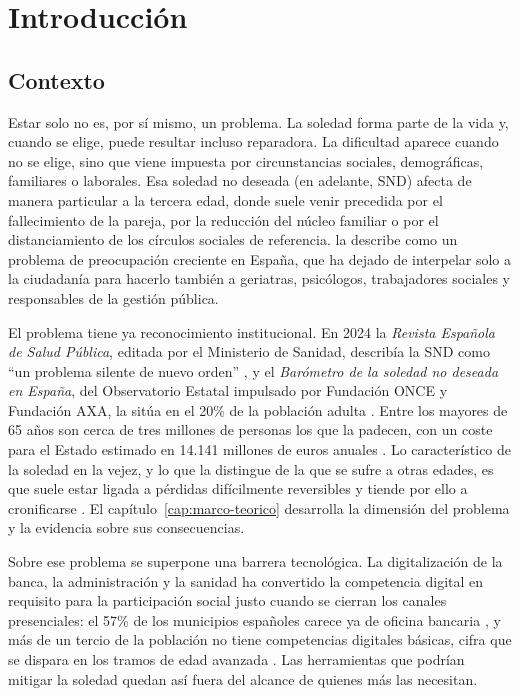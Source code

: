 \chapter{Introducción}
\label{cap:introduccion}

\section{Contexto}
\label{contexto}

Estar solo no es, por sí mismo, un problema. La soledad forma parte de la vida y, cuando se elige, puede
resultar incluso reparadora. La dificultad aparece cuando no se elige, sino que viene impuesta por
circunstancias sociales, demográficas, familiares o laborales. Esa soledad no deseada (en adelante, SND)
afecta de manera particular a la tercera edad, donde suele venir precedida por el fallecimiento de la pareja,
por la reducción del núcleo familiar o por el distanciamiento de los círculos sociales de referencia.
\textcite{RuedaEstrada2018} la describe como un problema de preocupación creciente en España, que ha dejado
de interpelar solo a la ciudadanía para hacerlo también a geriatras, psicólogos, trabajadores sociales y
responsables de la gestión pública.

El problema tiene ya reconocimiento institucional. En 2024 la \textit{Revista Española de Salud Pública},
editada por el Ministerio de Sanidad, describía la SND como \enquote{un problema silente de nuevo orden}
\citep{JimenezRodriguez2024}, y el \textit{Barómetro de la soledad no deseada en España}, del Observatorio
Estatal impulsado por Fundación ONCE y Fundación AXA, la sitúa en el 20\% de la población adulta
\citep{SoledadES}. Entre los mayores de 65 años son cerca de tres millones de personas los que la padecen,
con un coste para el Estado estimado en 14.141 millones de euros anuales \citep{Senara}. Lo característico
de la soledad en la vejez, y lo que la distingue de la que se sufre a otras edades, es que suele estar ligada a pérdidas difícilmente reversibles y tiende por ello a cronificarse \citep{FundacionONCE}. El
capítulo~\ref{cap:marco-teorico} desarrolla la dimensión del problema y la evidencia sobre sus consecuencias.

Sobre ese problema se superpone una barrera tecnológica. La digitalización de la banca, la administración y
la sanidad ha convertido la competencia digital en requisito para la participación social justo cuando se
cierran los canales presenciales: el 57\% de los municipios españoles carece ya de oficina bancaria
\citep{RevistaByte}, y más de un tercio de la población no tiene competencias digitales básicas, cifra que se
dispara en los tramos de edad avanzada \citep{espanol}. Las herramientas que podrían mitigar la soledad
quedan así fuera del alcance de quienes más las necesitan.

